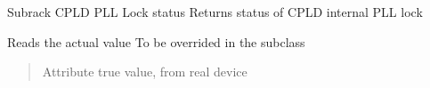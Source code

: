 \documentclass[letterpaper,10pt,english]{sphinxmanual}
\begin{document}
\begin{fulllineitems}
\label{\detokenize{webserverdocs:subrack_hardware.CPLD_PLL_Locked}}
\pysigstartsignatures
{}
\pysigstopsignatures
\sphinxAtStartPar
Subrack CPLD PLL Lock status
Returns status of CPLD internal PLL lock

\begin{fulllineitems}
\label{\detokenize{webserverdocs:subrack_hardware.CPLD_PLL_Locked.read_value}}
\pysigstartsignatures
{}
\pysigstopsignatures
\sphinxAtStartPar
Reads the actual value
To be overrided in the subclass
\begin{quote}\begin{description}
\sphinxAtStartPar
Attribute true value, from real device

\end{description}\end{quote}

\end{fulllineitems}


\end{fulllineitems}

\end{document}
